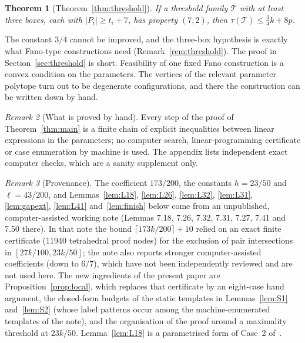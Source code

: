 \documentclass[11pt]{amsart}
\newtheorem{theorem}{Theorem}[section]
\theoremstyle{definition}
\theoremstyle{remark}
\newtheorem{remark}[theorem]{Remark}
\newcommand{\ceil}[1]{\lceil #1\rceil}
\begin{document}
\begin{theorem}[Theorem~\ref{thm:threshold}]\label{thm:intro-threshold}
If a threshold family $\mathcal T$ with at least three boxes, each with $|P_i|\ge t_i+7$, has property $(7,2)$, then $\tau(\mathcal T)\le\frac34k+8p$.
\end{theorem}

The constant $3/4$ cannot be improved, and the three-box hypothesis is exactly what Fano-type constructions need (Remark~\ref{rem:threshold}). The proof in Section~\ref{sec:threshold} is short. Feasibility of one fixed Fano construction is a convex condition on the parameters. The vertices of the relevant parameter polytope turn out to be degenerate configurations, and there the construction can be written down by hand.

\begin{remark}[What is proved by hand]
Every step of the proof of Theorem~\ref{thm:main} is a finite chain of explicit inequalities between linear expressions in the parameters; no computer search, linear-programming certificate or case enumeration by machine is used. The appendix lists independent exact computer checks, which are a sanity supplement only.
\end{remark}

\begin{remark}[Provenance]\label{rem:prov}
The coefficient $173/200$, the constants $h=23/50$ and $\ell=43/200$, and Lemmas~\ref{lem:L18}, \ref{lem:L26}, \ref{lem:L32}, \ref{lem:L31}, \ref{lem:gapext}, \ref{lem:L41} and~\ref{lem:finish} below come from an unpublished, computer-assisted working note (Lemmas 7.18, 7.26, 7.32, 7.31, 7.27, 7.41 and 7.50 there). In that note the bound $\ceil{173k/200}+10$ relied on an exact finite certificate (11940 tetrahedral proof nodes) for the exclusion of pair intersections in $[27k/100,23k/50]$; the note also reports stronger computer-assisted coefficients (down to $6/7$), which have not been independently reviewed and are not used here. The new ingredients of the present paper are Proposition~\ref{prop:local}, which replaces that certificate by an eight-case hand argument, the closed-form budgets of the static templates in Lemmas~\ref{lem:S1} and~\ref{lem:S2} (whose label patterns occur among the machine-enumerated templates of the note), and the organisation of the proof around a maximality threshold at $23k/50$. Lemma~\ref{lem:L18} is a parametrised form of Case~2 of~\cite[Lemma~1]{FKW}.
\end{remark}
\end{document}
